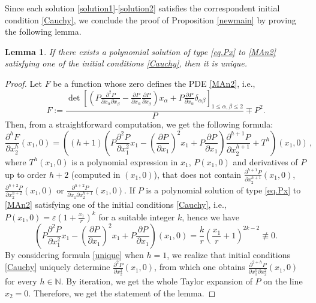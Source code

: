 \documentclass[11pt, reqno]{amsart}
\newtheorem{lem}[theor]{Lemma}
\newcommand{\de}{\partial}
\newcommand{\N}{\mathds{N}}
\newcommand{\e}{\varepsilon}
\begin{document}
Since each solution \eqref{solution1}-\eqref{solution2} satisfies the correspondent initial condition  \eqref{Cauchy}, we   conclude the proof of Proposition \ref{newmain} by proving the following lemma.
\begin{lem}
If there exists a polynomial solution of type  \eqref{eq.Px} to \eqref{MAn2}  satisfying one of the initial conditions \eqref{Cauchy}, then it is unique.
\end{lem}
\begin{proof}
Let $F$ be a function whose zero defines the PDE \eqref{MAn2}, i.e.,  
$$F:=\frac{\det\left[\left(P \frac{\partial^2 P}{\partial{x_\alpha}\partial{x_\beta}}-\frac{\partial P}{\partial{x_\alpha}}\frac{\partial P}{\partial{x_\beta}}\right)x_\alpha+P\frac{\partial P}{\partial{x_\alpha}} \delta_{\alpha\beta}\right]_{1\leq\alpha,\beta\leq 2}}{P}\mp P^{2}.$$
Then,
from a straightforward computation, we  get the following formula:
\begin{equation}\label{unique}
\frac{\partial^h F}{\partial x_2^h} (x_1,0)= \left( (h+1)\left( P\frac{\partial^2 P}{\partial x_1^2}x_1-\left(\frac{\partial P}{\partial x_1}\right)^2x_1+P\frac{\partial P}{\partial x_1}\right)\frac{\partial^{h+1} P}{\partial x_2^{h+1}} + T^h\right)(x_1,0)\,,
\end{equation}
where $T^h(x_1,0)$  is a polynomial expression in $x_1$, $P(x_1,0)$ and derivatives of $P$ up to order $h+2$ (computed in $(x_1,0)$), that does not contain $\frac{\partial^{h+1} P}{\partial x_2^{h+1}}(x_1,0)$,  $\frac{\partial^{h+2} P}{\partial x_2^{h+2}}(x_1,0)$ or $\frac{\partial^{h+2} P}{\de x_1 \partial x_2^{h+1}}(x_1,0)$.
If $P$ is a  polynomial solution of type  \eqref{eq.Px}  to \eqref{MAn2} satisfying one of the initial conditions \eqref{Cauchy},  i.e., $P(x_1,0)=\e\left(1+\frac{x_1}{r}\right)^k$ for a suitable integer $k$, hence we have
$$\left( P\frac{\partial^2 P}{\partial x_1^2}x_1-\left(\frac{\partial P}{\partial x_1}\right)^2x_1+P\frac{\partial P}{\partial x_1}\right)(x_1,0)=\frac{k}{r} \left( \frac{x_1}{r}+1\right)^{2k-2}\not\equiv0.$$
By considering formula \eqref{unique} when $h=1$, we realize that  initial conditions \eqref{Cauchy} uniquely determine $\frac{\partial^{2} P}{\partial x_2^{2}} (x_1,0)$, from which one obtains $\frac{\partial^{2+h} P}{\partial x_1^h\partial x_2^{2}} (x_1,0)$ for every $h\in \N$. By iteration, we get  the whole Taylor expansion of $P$ on the line $x_2=0$. Therefore, we get the statement of the lemma.
\end{proof}
\end{document}
